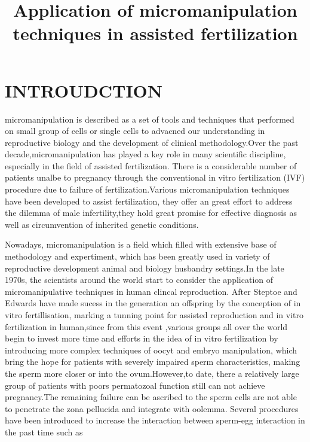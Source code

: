 \documentclass[12pt]{article}
\begin{document}
  
\title{\large Application of micromanipulation techniques in assisted fertilization  \vspace{-2em}}
\date{\vspace{-2.5em}}
\maketitle

\section{INTROUDCTION}
micromanipulation is described as a set of tools and techniques that performed on small group of cells or single cells to advacned our understanding in reproductive biology and the development of clinical
methodology.Over the past decade,micromanipulation has played a key role in many scientific discipline, especially in the field of 
assisted fertilization. There is a considerable number of patients unalbe to pregnancy through the conventional in vitro fertilization (IVF) procedure due to failure of fertilization.Various micromanipulation techniques have been developed to assist fertilization, they offer an great effort to address the dilemma of male infertility,they hold great promise for effective diagnosis as well as circumvention of inherited genetic conditions.\medskip


Nowadays, micromanipulation is a field which filled with extensive base of methodology and expertiment, which has been greatly used in variety of reproductive development animal and biology husbandry settings.In the late 1970s, the scientists around the world start to consider the application of micromanipulative techniques in human clincal reproduction. After Steptoe and Edwards have made sucess in  
the  generation an offspring by the conception of in vitro fertillisation, marking a tunning point for assisted reproduction  and  in vitro fertilization in human,since from this event ,various groups all over the world begin to invest more time and efforts in the idea of in vitro fertilization by introducing more complex  techniques of oocyt and embryo manipulation, which bring the hope for patients with severely impaired sperm characteristics, making the sperm more closer or into the ovum.However,to date, there  a relatively large group of patients with poors permatozoal function still can not achieve pregnancy.The remaining failure can be ascribed to the sperm cells are not able to penetrate the zona pellucida and integrate with oolemma. Several procedures have been introduced to  increase the interaction between sperm-egg interaction in the past time such as 
\end{document}
